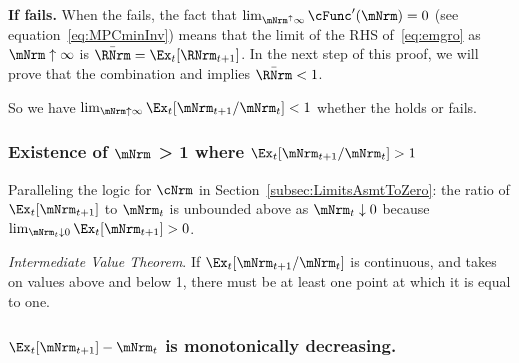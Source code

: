 \documentclass[\econtexRoot/BufferStockTheory]{subfiles}
\begin{document}
\textbf{If {\RIC} fails.}  When the {\RIC} fails, the fact that $\lim_{\mNrm^{\uparrow} \infty} \cFunc^{\prime}(\mNrm) = 0$ (see equation~\eqref{eq:MPCminInv}) means that the limit of the RHS of~\eqref{eq:emgro} as $\mNrm \uparrow \infty$ is $\bar{\RNrm}=\Ex_{t}[\RNrm_{t+1}]$.  In the next step of this proof, we will prove that the combination {\GICNrm} and \cncl{\RIC} implies $\bar{\RNrm} < 1$.

So we have $\lim_{\mNrm \uparrow \infty} \Ex_{t}[\mNrm_{t+1}/\mNrm_{t}] < 1$ whether the {\RIC} holds or fails.

\medskip

\subsubsection{Existence of \texorpdfstring{$\mNrm$}{m} > 1 where \texorpdfstring{$\Ex_t [{\mNrm}_{t+1}/\mNrm_t] > 1$}{E[m{t+1}/m{t}] > 1}}
Paralleling the logic for $\cNrm$ in Section~\ref{subsec:LimitsAsmtToZero}: the ratio of $\Ex_{t}[\mNrm_{t+1}]$ to $\mNrm_{t}$ is unbounded above as $\mNrm_{t} \downarrow 0$ because $\lim_{\mNrm_{t}\downarrow 0} \Ex_{t}[\mNrm_{t+1}] > 0$.

\medskip\medskip

\noindent \textit{Intermediate Value Theorem}.  If $\Ex_t [{\mNrm}_{t+1}/\mNrm_t]$ is continuous, and takes on values above and below 1, there must be at least one point at which it is equal to one.

\subsubsection{\texorpdfstring{$\Ex_t [{\mNrm}_{t+1}] -\mNrm_t$}{Delta m} is monotonically decreasing.}
\end{document}
